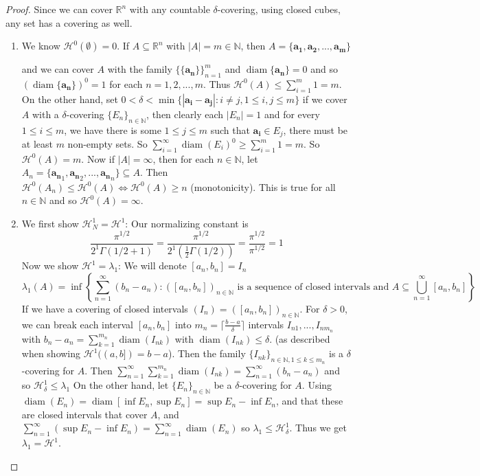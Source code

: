 \documentclass{article}
\theoremstyle{plain}
\theoremstyle{definition}
\DeclareMathOperator{\diam}{diam}
\theoremstyle{remark}
\begin{document}
\begin{proof} 
Since we can cover $\mathbb{R}^n$ with any countable $\delta$-covering, using closed cubes, any set has a covering as well.
    \begin{enumerate}
        \item We know $\mathcal{H}^0(\emptyset) = 0$. If $A \subseteq \mathbb{R}^n$ with $|A|=m \in 
        \mathbb{N}$, then $A = \{\mathbf{a_1}, \mathbf{a_2}, ..., \mathbf{a_m}\}$ 
        
        
        and we can cover $A$ with the family $\{\{\mathbf{a_n}\}\}_{n=1}^m$ and $\diam \{\mathbf{a_n}\} = 0$ and so $(\diam \{\mathbf{a_n}\})^0 = 1$ for each $n=1,2,...,m$. Thus $\mathcal{H}^0(A) \le \sum \limits _{i=1}^m 1 = m$. On the other hand, set $0<\delta < \min \{|\mathbf{a_i} - \mathbf{a_j}|: i\ne j, 1\le i,j\le m\}$ if we cover $A$ with a $\delta$-covering $\{E_n\}_{n\in \mathbb{N}}$, then clearly each $|E_n| = 1$ and for every $1\le i\le m$, we have there is some $1\le j\le m$ such that $\mathbf{a_i} \in E_j$, there must be at least $m$ non-empty sets. So $\sum \limits _{i=1}^\infty \diam (E_i)^0 \ge \sum \limits _{i=1}^m 1 = m$. So $\mathcal{H}^0(A) = m$. Now if $|A| = \infty$, then for each $n \in 
        \mathbb{N}$, let $A_n = \{\mathbf{a_n}_1, \mathbf{a_n}_2, ..., \mathbf{a_n}_n\} \subseteq A$. Then \\ $\mathcal{H}^0(A_n) \le \mathcal{H}^0(A) \iff \mathcal{H}^0(A) \ge n$ (monotonicity). This is true for all $n\in \mathbb{N}$ and so $\mathcal{H}^0(A) = \infty$. 

        \item We first show $\mathcal{H}^1_N = \mathcal{H}^1$: Our normalizing constant is 
        \[\frac{\pi ^{1/2}}{2^1 \Gamma (1/2+1)} = \frac{\pi ^{1/2}}{2^1 ( \frac{1}{2} \Gamma(1/2))} = \frac{\pi ^{1/2}}{\pi ^{1/2}} = 1\]
        Now we show $\mathcal{H}^1 = \lambda_1$: We will denote $[a_n, b_n] = I_n$
            \[
            \lambda_1(A) = \inf \left \{ \sum \limits _{n=1}^\infty (b_n-a_n) : ([a_n, b_n])_{n\in \mathbb{N}}  \text{ is a sequence of closed intervals and } A\subseteq \bigcup \limits _{n=1}^\infty [a_n, b_n] \right \}
            \]
            If we have a covering of closed intervals $(I_n) = ([a_n, b_n])_{n\in \mathbb{N}}$. For $\delta >0$, we can break each interval $[a_n,b_n]$ into $m_n=\lceil \frac{b-a}{\delta}\rceil $ intervals $I_{n1}, ..., I_{nm_n}$ with $b_n-a_n=\sum \limits _{k=1}^{m_n} \diam (I_{nk})$ with $\diam (I_{nk}) \le \delta$. (as described when showing $\mathcal{H}^1((a,b]) = b-a$). Then the family $\{I_{nk}\}_{n\in \mathbb{N}, 1\le k\le m_n}$ is a $\delta$-covering for $A$. Then $\sum \limits _{n=1}^\infty \sum \limits _{k=1}^{m_n} \diam (I_{nk}) = \sum \limits _{n=1}^\infty (b_n-a_n)$ and so $\mathcal{H}^1_\delta \le \lambda_1$
        On the other hand, let $\{E_n\}_{n\in \mathbb{N}}$ be a $\delta$-covering for $A$. Using $\diam (E_n) = \diam [\inf E_n, \sup E_n] = \sup E_n - \inf E_n $, and that these are closed intervals that cover $A$, and $\sum \limits _{n=1}^\infty (\sup E_n - \inf E_n)  = \sum \limits _{n=1}^\infty \diam (E_n)$ so $\lambda_1 \le \mathcal{H}^1_\delta $. Thus we get $\lambda_1 = \mathcal{H}^1$.


\end{enumerate}
\end{proof}
\end{document}
